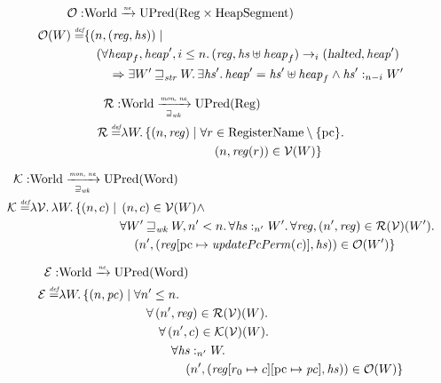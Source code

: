 \documentclass{article}
\newcommand{\update}[2]{[#1 \mapsto #2]}
\newcommand{\nefun}{\xrightarrow{\textit{\tiny{ne}}}}
\newcommand{\defeq}{\stackrel{\textit{\tiny{def}}}{=}}
\newcommand{\var}[1]{\mathit{#1}}
\newcommand{\hs}{\var{hs}}
\newcommand{\pc}{\mathit{pc}}
\newcommand{\pcreg}{\mathrm{pc}}
\newcommand{\reg}{\var{reg}}
\newcommand{\heap}{\var{heap}}
\newcommand{\halted}{\textsl{halted}}
\newcommand{\plainfun}[2]{
  \ifthenelse{\equal{#2}{}}
             {\mathit{#1}}
             {\mathit{#1}(#2)}
}
\newcommand{\updatePcPerm}[1]{\plainfun{updatePcPerm}{#1}}
\newcommand{\futurewk}{\mathbin{\sqsupseteq}_{\var{wk}}}
\newcommand{\futurestr}{\mathbin{\sqsupseteq}_{\var{str}}}
\newcommand{\heapSat}[3][\heap]{#1 :_{#2} #3}
\newcommand{\monwknefun}{\xrightarrow[\text{\tiny{$\futurewk$}}]{\textit{\tiny{mon, ne}}}}
\newcommand{\asmType}{\plaindom{AsmType}}
\newcommand{\plaindom}[1]{\mathrm{#1}}
\newcommand{\Words}{\plaindom{Word}}
\newcommand{\RegName}{\plaindom{RegisterName}}
\newcommand{\Regs}{\plaindom{Reg}}
\newcommand{\HeapSegments}{\plaindom{HeapSegment}}
\newcommand{\Worlds}{\plaindom{World}}
\newcommand{\UPred}[1]{\plaindom{UPred}(#1)}
\newcommand{\intr}[2]{\mathcal{#1}}
\newcommand{\valueintr}[1]{\intr{V}{#1}}
\newcommand{\exprintr}[1]{\intr{E}{#1}}
\newcommand{\contintr}[1]{\intr{K}{#1}}
\newcommand{\regintr}[1]{\intr{R}{#1}}
\newcommand{\stdvr}{\valueintr{\asmType}}
\newcommand{\stder}{\exprintr{\asmType}}
\newcommand{\stdrr}{\regintr{\asmType}}
\newcommand{\stdkr}{\contintr{\asmType}}
\newcommand{\observations}{\mathcal{O}}
\newcommand{\npair}[2][n]{\left(#1,#2 \right)}
\newcommand{\step}[1][]{\rightarrow_{#1}}
\begin{document}
\begin{align*}
  \observations : &  \Worlds \nefun \UPred{\Regs \times \HeapSegments} \\
  \observations (W) \defeq & \{ \npair{(\reg,\hs)} \mid \\
                           & \quad (\forall \heap_f, \heap', i \leq n \ldotp (\reg,\hs \uplus \heap_f) \step[i] (\halted,\heap')  \\
                           & \qquad \Rightarrow \exists W' \futurestr W \ldotp\exists \hs' \ldotp \heap' = \hs' \uplus \heap_f \land \heapSat[\hs']{n-i}{W'}
\end{align*}

\begin{align*}
  \stdrr : & \Worlds \monwknefun \UPred{\Regs} \\
  \stdrr \defeq & \lambda W \ldotp
                     \begin{aligned}[t]
                       \{ \npair{\reg} \mid & \;\forall r \in \RegName \setminus \{\pcreg\} \ldotp \\
                                            & \;\quad  \npair{\reg(r)} \in \stdvr(W) \}
                     \end{aligned}
\end{align*}

\begin{align*}
  \stdkr : &  \Worlds \monwknefun \UPred{\Words} \\
  \stdkr \defeq & \lambda \stdvr \ldotp \lambda W \ldotp\{ \npair{c} \mid
                     \begin{aligned}[t]
                       & \npair{c} \in \stdvr(W) \land \\
                       &  \forall W' \futurewk W, n' < n\ldotp
                       \forall \heapSat[\hs]{n'}{W'} \ldotp \forall \reg, \npair[n']{\reg} \in \stdrr(\stdvr)(W') \ldotp \\
                       & \quad \npair[n']{(\reg\update{\pcreg}{\updatePcPerm{\var{c}}},\hs)} \in \observations(W') \}
                 \end{aligned}
\end{align*}

\begin{align*}
  \stder : & \Worlds \nefun \UPred{\Words} \\
  \stder \defeq & \lambda W \ldotp \{ \npair{\pc} \mid 
  \begin{aligned}[t]
    & \forall n' \leq n \ldotp\\
    & \quad \forall \npair[n']{\reg} \in \stdrr(\stdvr)(W) \ldotp \\
    & \quad \quad \forall \npair[n']{c} \in \stdkr(\stdvr)(W) \ldotp \\
    & \quad \qquad  \forall \heapSat[\hs]{n'}{W} \ldotp \\
    & \quad \qquad \quad \npair[n']{(\reg\update{r_0}{c}\update{\pcreg}{\pc},\hs)} \in \observations(W) \}
  \end{aligned}
\end{align*}
\end{document}
